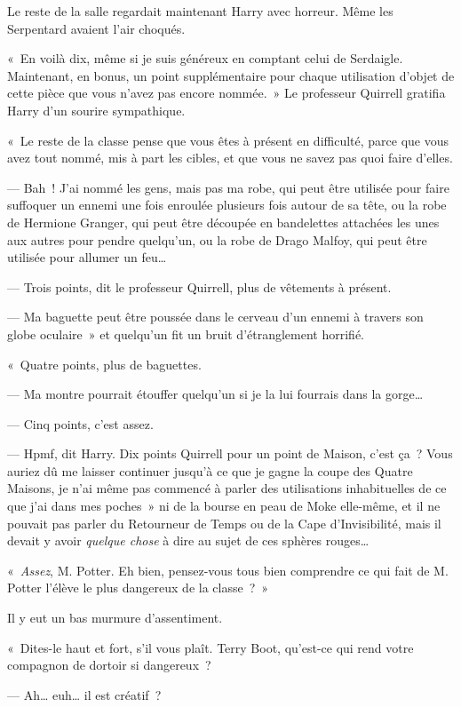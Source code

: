 Le reste de la salle regardait maintenant Harry avec horreur. Même les Serpentard avaient l'air choqués.

«~En voilà dix, même si je suis généreux en comptant celui de Serdaigle. Maintenant, en bonus, un point supplémentaire pour chaque utilisation d'objet de cette pièce que vous n'avez pas encore nommée.~» Le professeur Quirrell gratifia Harry d'un sourire sympathique.

«~Le reste de la classe pense que vous êtes à présent en difficulté, parce que vous avez tout nommé, mis à part les cibles, et que vous ne savez pas quoi faire d'elles.

--- Bah~! J'ai nommé les gens, mais pas ma robe, qui peut être utilisée pour faire suffoquer un ennemi une fois enroulée plusieurs fois autour de sa tête, ou la robe de Hermione Granger, qui peut être découpée en bandelettes attachées les unes aux autres pour pendre quelqu'un, ou la robe de Drago Malfoy, qui peut être utilisée pour allumer un feu…

--- Trois points, dit le professeur Quirrell, plus de vêtements à présent.

--- Ma baguette peut être poussée dans le cerveau d'un ennemi à travers son globe oculaire~» et quelqu'un fit un bruit d'étranglement horrifié.

«~Quatre points, plus de baguettes.

--- Ma montre pourrait étouffer quelqu'un si je la lui fourrais dans la gorge…

--- Cinq points, c'est assez.

--- Hpmf, dit Harry. Dix points Quirrell pour un point de Maison, c'est ça~? Vous auriez dû me laisser continuer jusqu'à ce que je gagne la coupe des Quatre Maisons, je n'ai même pas commencé à parler des utilisations inhabituelles de ce que j'ai dans mes poches~» ni de la bourse en peau de Moke elle-même, et il ne pouvait pas parler du Retourneur de Temps ou de la Cape d'Invisibilité, mais il devait y avoir \emph{quelque chose} à dire au sujet de ces sphères rouges…

«~\emph{Assez}, M. Potter. Eh bien, pensez-vous tous bien comprendre ce qui fait de M. Potter l'élève le plus dangereux de la classe~?~»

Il y eut un bas murmure d'assentiment.

«~Dites-le haut et fort, s'il vous plaît. Terry Boot, qu'est-ce qui rend votre compagnon de dortoir si dangereux~?

--- Ah… euh… il est créatif~?

